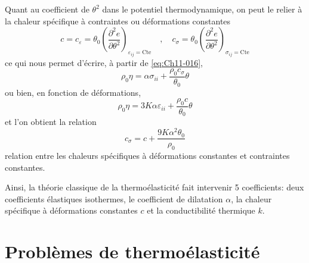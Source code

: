 Quant au coefficient de $\theta^2$ dans le potentiel thermodynamique, on peut le relier à la chaleur spécifique à contraintes ou déformations constantes 
\begin{equation}
    c = c_{\varepsilon} = \theta_0 \left(\frac{\partial^2 e}{\partial \theta^2}\right)_{\varepsilon_{ij}=\mbox{Cte}} \quad , \quad c_{\sigma} = \theta_0 \left(\frac{\partial^2 e}{\partial \theta^2}\right)_{\sigma_{ij}=\mbox{Cte}}
    \label{eq:Ch11-022}
\end{equation}
ce qui nous permet d'écrire, à partir de \eqref{eq:Ch11-016}, 
\begin{equation}
    \rho_0\eta = \alpha \sigma_{ii} + \frac{\rho_0 c_{\sigma}}{\theta_0}\theta
    \label{eq:Ch11-023}
\end{equation}
ou bien, en fonction de déformations, 
\begin{equation}
    \rho_0\eta = 3 K \alpha \varepsilon_{ii} + \frac{\rho_0 c}{\theta_0}\theta
    \label{eq:Ch11-024}
\end{equation}
et l'on obtient la relation 
\begin{equation}
    c_{\sigma} = c +\frac{9 K \alpha^2 \theta_0}{\rho_0}
    \label{eq:Ch11-025}
\end{equation}
relation entre les chaleurs spécifiques à déformations constantes et contraintes constantes. 

Ainsi, la théorie classique de la thermoélasticité fait intervenir 5 coefficients: deux coefficients élastiques isothermes, le coefficient de dilatation $\alpha$, la chaleur spécifique à déformations constantes $c$ et la conductibilité thermique $k$.

\section{Problèmes de thermoélasticité}\label{sec:Ch11-2}
